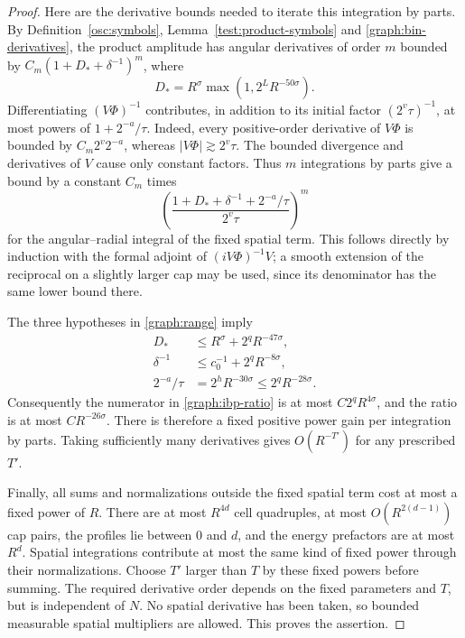 \begin{proof}
Here are the derivative bounds needed to iterate this integration by
parts.  By Definition~\ref{osc:symbols}, Lemma~\ref{test:product-symbols}
and \eqref{graph:bin-derivatives}, the product amplitude has angular
derivatives of order $m$ bounded by
$C_m(1+D_*+\delta^{-1})^m$, where
\[
 D_*=R^\sigma\max(1,2^LR^{-50\sigma}).
\]
Differentiating $(V\Phi)^{-1}$ contributes, in addition to its initial
factor $(2^v\tau)^{-1}$, at most powers of
$1+2^{-a}/\tau$.  Indeed, every positive-order derivative of $V\Phi$
is bounded by $C_m2^v2^{-a}$, whereas $|V\Phi|\gtrsim2^v\tau$.
The bounded divergence and derivatives of $V$ cause only constant
factors.  Thus $m$ integrations by parts give a bound by a constant
$C_m$ times
\begin{equation}\label{graph:ibp-ratio}
 \left(
 \frac{1+D_*+\delta^{-1}+2^{-a}/\tau}{2^v\tau}
 \right)^m
\end{equation}
for the angular--radial integral of the fixed spatial term.
This follows directly by induction with the formal adjoint of
$(iV\Phi)^{-1}V$; a smooth extension of the reciprocal on a slightly
larger cap may be used, since its denominator has the same lower
bound there.

The three hypotheses in \eqref{graph:range} imply
\begin{align*}
 D_*&\le R^\sigma+2^qR^{-47\sigma},\\
 \delta^{-1}&\le c_0^{-1}+2^qR^{-8\sigma},\\
 2^{-a}/\tau&=2^hR^{-30\sigma}\le2^qR^{-28\sigma}.
\end{align*}
Consequently the numerator in \eqref{graph:ibp-ratio} is at most
$C2^qR^{4\sigma}$, and the ratio is at most $CR^{-26\sigma}$.
There is therefore a fixed positive power gain per integration by
parts.  Taking sufficiently many derivatives gives $O(R^{-T'})$
for any prescribed $T'$.

Finally, all sums and normalizations outside the fixed spatial term
cost at most a fixed power of $R$.  There are at most $R^{4d}$ cell
quadruples, at most $O(R^{2(d-1)})$ cap pairs, the profiles lie between
$0$ and $d$, and the energy prefactors are at most $R^d$.  Spatial
integrations contribute at most the same kind of fixed power through
their normalizations.  Choose $T'$ larger than $T$ by these fixed
powers before summing.  The required derivative order depends on the
fixed parameters and $T$, but is independent of $N$.  No spatial
derivative has been taken, so bounded measurable spatial multipliers
are allowed.  This proves the assertion.
\end{proof}

